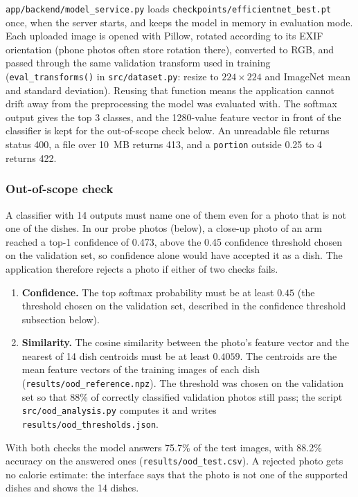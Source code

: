 \texttt{app/backend/model\_service.py} loads
\texttt{checkpoints/efficientnet\_best.pt} once, when the server starts, and keeps
the model in memory in evaluation mode. Each uploaded image is opened with Pillow,
rotated according to its EXIF orientation (phone photos often store rotation
there), converted to RGB, and passed through the same validation transform used
in training (\texttt{eval\_transforms()} in \texttt{src/dataset.py}: resize to
$224 \times 224$ and ImageNet mean and standard deviation). Reusing that function
means the application cannot drift away from the preprocessing the model was
evaluated with. The softmax output gives the top 3 classes, and the 1280-value
feature vector in front of the classifier is kept for the out-of-scope check
below. An unreadable file returns status 400, a file over 10~MB returns 413, and
a \texttt{portion} outside 0.25 to 4 returns 422.

\subsubsection{Out-of-scope check}
A classifier with 14 outputs must name one of them even for a photo that is not
one of the dishes. In our probe photos (below), a close-up photo of an arm
reached a top-1 confidence of 0.473, above the 0.45 confidence threshold chosen on
the validation set, so confidence alone would have accepted it as a dish. The application therefore rejects a photo if
either of two checks fails.
\begin{enumerate}
  \item \textbf{Confidence.} The top softmax probability must be at least
        $0.45$ (the threshold chosen on the validation set, described in the
        confidence threshold subsection below).
  \item \textbf{Similarity.} The cosine similarity between the photo's feature
        vector and the nearest of 14 dish centroids must be at least
        $0.4059$. The centroids are the mean feature vectors of the training
        images of each dish (\texttt{results/ood\_reference.npz}). The threshold
        was chosen on the validation set so that 88\% of correctly classified
        validation photos still pass; the script \texttt{src/ood\_analysis.py}
        computes it and writes \texttt{results/ood\_thresholds.json}.
\end{enumerate}
With both checks the model answers 75.7\% of the test images, with 88.2\%
accuracy on the answered ones (\texttt{results/ood\_test.csv}). A rejected photo
gets no calorie estimate: the interface says that the photo is not one of the
supported dishes and shows the 14 dishes.

